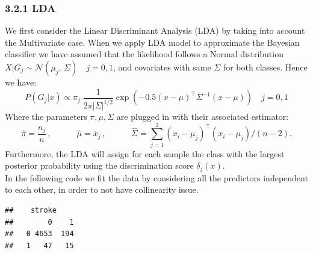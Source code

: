 \documentclass[
]{article}
\newenvironment{Shaded}{\begin{snugshade}}{\end{snugshade}}
\newcommand{\DecValTok}[1]{\textcolor[rgb]{0.00,0.00,0.81}{#1}}
\newcommand{\FunctionTok}[1]{\textcolor[rgb]{0.00,0.00,0.00}{#1}}
\newcommand{\NormalTok}[1]{#1}
\newcommand{\OtherTok}[1]{\textcolor[rgb]{0.56,0.35,0.01}{#1}}
\newcommand{\SpecialCharTok}[1]{\textcolor[rgb]{0.00,0.00,0.00}{#1}}
\begin{document}
\hypertarget{lda}{%
\subsubsection{3.2.1 LDA}\label{lda}}

We first consider the Linear Discriminant Analysis (LDA) by taking into
account the Multivariate case. When we apply LDA model to approximate
the Bayesian classifier we have assumed that the likelihood follows a
Normal distribution
\(X|G_j \sim \mathcal{N}(\mu_j,\,\Sigma) \quad j=0, 1\), and covariates
with same \(\Sigma\) for both classes. Hence we have:
\[P(G_j | x) \propto \pi_j \; \frac{1}{2\pi |\Sigma|^{1/2}} \exp \left(-0.5 (x - \mu)^\top \Sigma^{-1} (x-\mu) \right) \quad j=0,1 \]
Where the parameters \(\pi, \mu, \Sigma\) are plugged in with their
associated estimator:
\[\hat\pi = \frac{n_j}{n}\,, \qquad \quad\hat\mu = \overline x_j\,, \qquad \quad\hat\Sigma = \sum_{j=1}^{2} (x_i-\mu_j)^\top (x_i-\mu_j) / (n-2).\]
Furthermore, the LDA will assign for each sample the class with the
largest posterior probability using the discrimination score
\(\delta_j(x)\).\\
In the following code we fit the data by considering all the predictors
independent to each other, in order to not have collinearity issue.

\begin{Shaded}
\end{Shaded}

\begin{verbatim}
##    stroke
##        0    1
##   0 4653  194
##   1   47   15
\end{verbatim}
\end{document}

